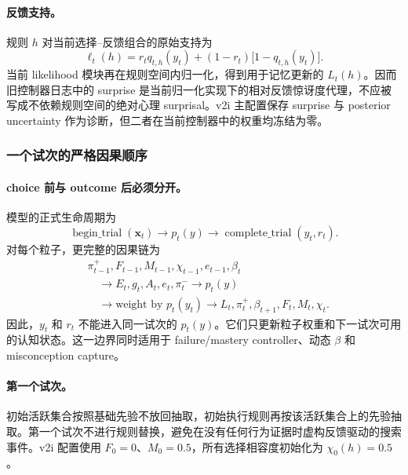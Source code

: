 \paragraph{反馈支持。}
规则 $h$ 对当前选择--反馈组合的原始支持为
\begin{equation}
\ell_t(h)
=r_tq_{t,h}(y_t)
+(1-r_t)\bigl[1-q_{t,h}(y_t)\bigr].
\label{eq:model0811-feedback-support}
\end{equation}
当前 likelihood 模块再在规则空间内归一化，得到用于记忆更新的 $L_t(h)$。因而旧控制器日志中的 surprise 是当前归一化实现下的相对反馈惊讶度代理，不应被写成不依赖规则空间的绝对心理 surprisal。v2i 主配置保存 surprise 与 posterior uncertainty 作为诊断，但二者在当前控制器中的权重均冻结为零。


\subsubsection{一个试次的严格因果顺序}

\paragraph{choice 前与 outcome 后必须分开。}
模型的正式生命周期为
\begin{equation}
\operatorname{begin\_trial}(\mathbf x_t)
\longrightarrow p_t(y)
\longrightarrow
\operatorname{complete\_trial}(y_t,r_t).
\label{eq:model0811-lifecycle}
\end{equation}
对每个粒子，更完整的因果链为
\begin{equation}
\begin{aligned}
&\pi^+_{t-1},F_{t-1},M_{t-1},
\chi_{t-1},e_{t-1},\beta_t
\\
&\quad\longrightarrow
E_t,g_t,A_t,e_t,\pi^-_t
\longrightarrow p_t(y)
\\
&\quad\longrightarrow
\text{weight by }p_t(y_t)
\longrightarrow
L_t,\pi^+_t,\beta_{t+1},F_t,M_t,\chi_t.
\end{aligned}
\label{eq:model0811-causal-order}
\end{equation}
因此，$y_t$ 和 $r_t$ 不能进入同一试次的 $p_t(y)$。它们只更新粒子权重和下一试次可用的认知状态。这一边界同时适用于 failure/mastery controller、动态 $\beta$ 和 misconception capture。

\paragraph{第一个试次。}
初始活跃集合按照基础先验不放回抽取，初始执行规则再按该活跃集合上的先验抽取。第一个试次不进行规则替换，避免在没有任何行为证据时虚构反馈驱动的搜索事件。v2i 配置使用 $F_0=0$、$M_0=0.5$，所有选择相容度初始化为 $\chi_0(h)=0.5$。


